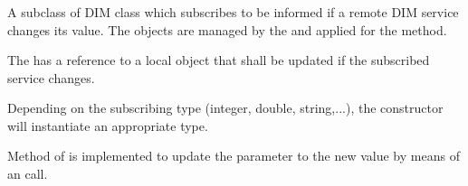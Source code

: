 \subsubsection{}
A subclass of DIM class  which subscribes
to be informed if a remote DIM service changes its value. 
The  objects are managed by the
 and applied for the  method.

\begin{compactenum} 

\item The  has a reference to
a local  object that shall be updated
if the subscribed service changes. 

\item Depending on the subscribing  type
(integer, double, string,...), the  constructor will
instantiate an appropriate  type.

\item Method  of  
is implemented to update the parameter to the new value
by means of an  call.

\end{compactenum}

   
 
 
